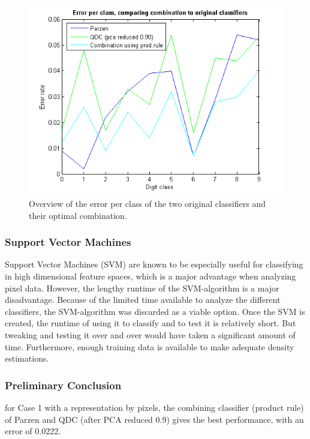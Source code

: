 \begin{figure}[H]
	\centering
	\includegraphics[scale=0.8]{images/pr_figure_4.png}
	\caption{Overview of the error per class of the two original classifiers and their optimal combination.}
	\label{fig:errorpdigit3}
\end{figure}
\subsubsection*{Support Vector Machines}
Support Vector Machines (SVM) are known to be especially useful for classifying in high dimensional feature spaces, which is a major advantage when analyzing pixel data. However, the lengthy runtime of the SVM-algorithm is a major disadvantage. Because of the limited time available to analyze the different classifiers, the SVM-algorithm was discarded as a viable option. Once the SVM is created, the runtime of using it to classify and to test it is relatively short. But tweaking and testing it over and over would have taken a significant amount of time. Furthermore, enough training data is available to make adequate density estimations.

\subsubsection*{Preliminary Conclusion} for Case 1 with a representation by pixels, the combining classifier (product rule) of Parzen and QDC (after PCA reduced 0.9) gives the best performance, with an error of 0.0222.

